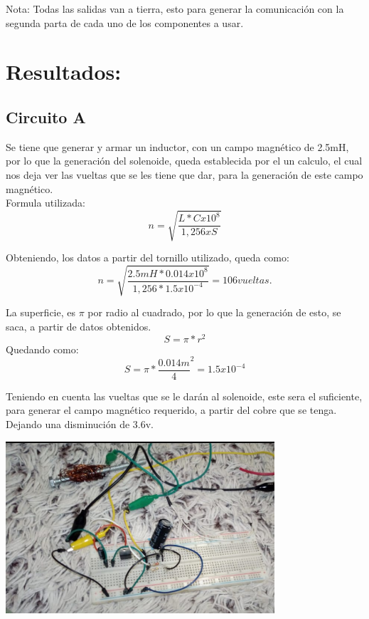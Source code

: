 \documentclass[12pt,letterpaper]{article}
\begin{document}
Nota: Todas las salidas van a tierra, esto para generar la comunicación con la segunda parta de cada uno de los componentes a usar.

\section{Resultados:}

\subsection{Circuito A}
Se tiene que generar y armar un inductor, con un campo magnético de 2.5mH, por lo que la generación del solenoide, queda establecida por el un calculo, el cual nos deja ver las vueltas que se les tiene que dar, para la generación de este campo magnético. \\

Formula utilizada:\\
$$ n=\sqrt{\frac{L*Cx10^{8}}{1,256 x S}} $$

Obteniendo, los datos a partir del tornillo utilizado, queda como:\\
$$ n=\sqrt{\frac{2.5mH*0.014x10^{8}}{1,256 * 1.5x10^{-4}}}= 106 vueltas. $$

La superficie, es $ \pi $ por radio al cuadrado, por lo que la generación de esto, se saca, a partir de datos obtenidos.\\
$$ S=\pi * r^{2} $$
\newpage
Quedando como:\\

$$ S=\pi * \frac{0.014m}{4}^{2}= 1.5x10^{-4} $$

Teniendo en cuenta las vueltas que se le darán al solenoide, este sera el suficiente, para generar el campo magnético requerido, a partir del cobre que se tenga. Dejando una disminución de 3.6v.\\

\begin{center}
\includegraphics[width=10cm]{resul1.jpeg} 
\end{center}
\end{document}

